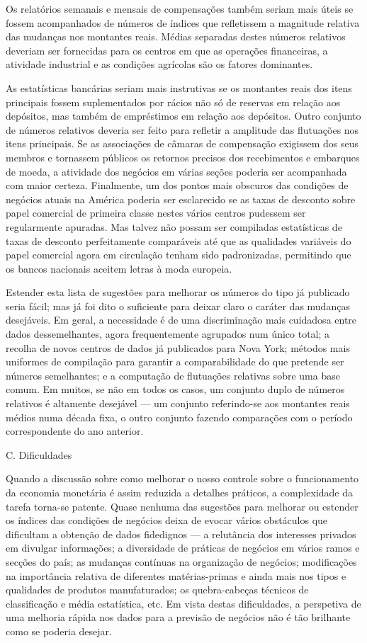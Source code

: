 \documentclass[12pt]{article}
\begin{document}
Os relatórios semanais e mensais de compensações também seriam mais úteis se fossem acompanhados de números de índices que refletissem a magnitude relativa das mudanças nos montantes reais. Médias separadas destes números relativos deveriam ser fornecidas para os centros em que as operações financeiras, a atividade industrial e as condições agrícolas são os fatores dominantes.

As estatísticas bancárias seriam mais instrutivas se os montantes reais dos itens principais fossem suplementados por rácios não só de reservas em relação aos depósitos, mas também de empréstimos em relação aos depósitos. Outro conjunto de números relativos deveria ser feito para refletir a amplitude das flutuações nos itens principais. Se as associações de câmaras de compensação exigissem dos seus membros e tornassem públicos os retornos precisos dos recebimentos e embarques de moeda, a atividade dos negócios em várias seções poderia ser acompanhada com maior certeza. Finalmente, um dos pontos mais obscuros das condições de negócios atuais na América poderia ser esclarecido se as taxas de desconto sobre papel comercial de primeira classe nestes vários centros pudessem ser regularmente apuradas. Mas talvez não possam ser compiladas estatísticas de taxas de desconto perfeitamente comparáveis até que as qualidades variáveis do papel comercial agora em circulação tenham sido padronizadas, permitindo que os bancos nacionais aceitem letras à moda europeia.

Estender esta lista de sugestões para melhorar os números do tipo já publicado seria fácil; mas já foi dito o suficiente para deixar claro o caráter das mudanças desejáveis. Em geral, a necessidade é de uma discriminação mais cuidadosa entre dados dessemelhantes, agora frequentemente agrupados num único total; a recolha de novos centros de dados já publicados para Nova York; métodos mais uniformes de compilação para garantir a comparabilidade do que pretende ser números semelhantes; e a computação de flutuações relativas sobre uma base comum. Em muitos, se não em todos os casos, um conjunto duplo de números relativos é altamente desejável — um conjunto referindo-se aos montantes reais médios numa década fixa, o outro conjunto fazendo comparações com o período correspondente do ano anterior.

C. Dificuldades

Quando a discussão sobre como melhorar o nosso controle sobre o funcionamento da economia monetária é assim reduzida a detalhes práticos, a complexidade da tarefa torna-se patente. Quase nenhuma das sugestões para melhorar ou estender os índices das condições de negócios deixa de evocar vários obstáculos que dificultam a obtenção de dados fidedignos — a relutância dos interesses privados em divulgar informações; a diversidade de práticas de negócios em vários ramos e secções do país; as mudanças contínuas na organização de negócios; modificações na importância relativa de diferentes matérias-primas e ainda mais nos tipos e qualidades de produtos manufaturados; os quebra-cabeças técnicos de classificação e média estatística, etc. Em vista destas dificuldades, a perspetiva de uma melhoria rápida nos dados para a previsão de negócios não é tão brilhante como se poderia desejar.
\end{document}
